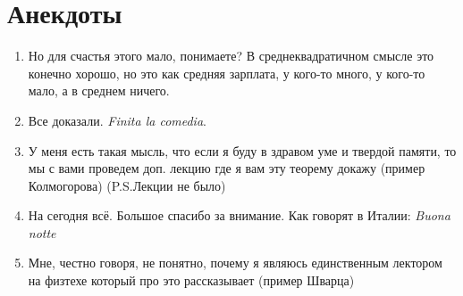 \newpage
\section{Анекдоты}
\begin{enumerate}
	\item Но для счастья этого мало, понимаете? В среднеквадратичном смысле это конечно хорошо, но это как средняя зарплата, у кого-то много, у кого-то мало, а в среднем ничего.

	\item Все доказали. \textit{Finita la comedia}.

	\item У меня есть такая мысль, что если я буду в здравом уме и твердой памяти, то мы с вами проведем доп. лекцию где я вам эту теорему докажу (пример Колмогорова) (P.S.Лекции не было)

	\item На сегодня всё. Большое спасибо за внимание. Как говорят в Италии: \textit{Buona notte}

	\item Мне, честно говоря, не понятно, почему я являюсь единственным лектором на физтехе который про это рассказывает (пример Шварца)
\end{enumerate}